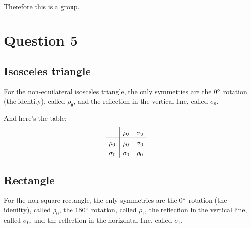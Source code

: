 \documentclass[a4paper]{article}
\begin{document}
Therefore this is a group.

\section*{Question 5}
\setcounter{section}{5}
\setcounter{subsection}{0}

\subsection{Isosceles triangle}

For the non-equilateral isosceles triangle, the only symmetries are the $0\degree$ rotation (the identity), called $\rho_0$, and the reflection in the vertical line, called $\sigma_0$.

\begin{center}
\end{center}

And here's the table:
\[
\setlength{\extrarowheight}{3pt}%
\begin{array}{l|*{2}{l}}
    & \rho_0 & \sigma_0 \\
\hline
\rho_0 & \rho_0 & \sigma_0 \\
\sigma_0 & \sigma_0 & \rho_0 \\
\end{array} 
\]

\subsection{Rectangle}

For the non-square rectangle, the only symmetries are the $0\degree$ rotation (the identity), called $\rho_0$, the $180\degree$ rotation, called $\rho_1$, the reflection in the vertical line, called $\sigma_0$, and the reflection in the horizontal line, called $\sigma_1$.

\begin{center}
\end{center}
\end{document}
